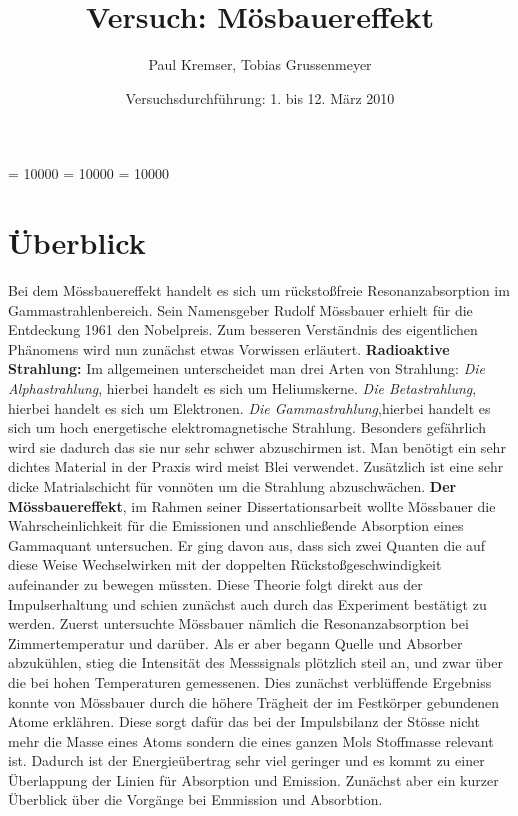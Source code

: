 \documentclass[12pt]{article}
\newcommand{\changefont}[3]{
\fontfamily{#1} \fontseries{#2} \fontshape{#3} \selectfont}
\begin{document}
\clubpenalty = 10000
\widowpenalty = 10000 
\displaywidowpenalty = 10000

\onehalfspacing
\changefont{ptm}{m}{n} 

\begin{titlepage}
\author{Paul Kremser, Tobias Grussenmeyer}
\title{Versuch: Mösbauereffekt}
\date{Versuchsdurchführung: 1. bis 12. März 2010} 
\maketitle
\thispagestyle{empty}
\end{titlepage}


\tableofcontents
\thispagestyle{empty}
\newpage
{}
\section{Überblick}
Bei dem Mössbauereffekt handelt es sich um rückstoßfreie Resonanzabsorption im Gammastrahlenbereich.
Sein Namensgeber Rudolf Mössbauer erhielt für die Entdeckung 1961 den Nobelpreis. Zum besseren Verständnis des
eigentlichen Phänomens wird nun zunächst etwas Vorwissen erläutert.
\textbf{Radioaktive Strahlung:}
Im allgemeinen unterscheidet man drei Arten von Strahlung:
\textit{Die Alphastrahlung}, 
hierbei handelt es sich um Heliumskerne.
\textit{Die Betastrahlung},
hierbei handelt es sich um Elektronen.
\textit{Die Gammastrahlung},hierbei handelt es sich um hoch energetische elektromagnetische Strahlung.
Besonders gefährlich wird sie dadurch das sie nur sehr schwer abzuschirmen ist. Man benötigt ein sehr dichtes Material in der Praxis
wird meist Blei verwendet. Zusätzlich ist eine sehr dicke Matrialschicht für vonnöten um die Strahlung abzuschwächen.
\newline
\textbf{Der Mössbauereffekt},
im Rahmen seiner Dissertationsarbeit wollte Mössbauer die Wahrscheinlichkeit für die Emissionen und anschließende Absorption eines Gammaquant untersuchen.
Er ging davon aus, dass sich zwei Quanten die auf diese Weise Wechselwirken mit der doppelten Rückstoßgeschwindigkeit aufeinander zu bewegen müssten.
Diese Theorie folgt direkt aus der Impulserhaltung und schien zunächst auch durch das Experiment bestätigt zu werden. Zuerst untersuchte Mössbauer nämlich die
Resonanzabsorption bei Zimmertemperatur und darüber. Als er aber begann Quelle und Absorber abzukühlen, stieg die Intensität des Messsignals plötzlich steil an,
und zwar über die bei hohen Temperaturen gemessenen. Dies zunächst verblüffende Ergebniss konnte von Mössbauer durch die höhere Trägheit der im Festkörper
gebundenen Atome erklähren. Diese sorgt dafür das bei der Impulsbilanz der Stösse nicht mehr die Masse eines Atoms sondern die eines ganzen Mols Stoffmasse 
relevant ist. Dadurch ist der Energieübertrag sehr viel geringer und es kommt zu einer Überlappung der Linien für Absorption und Emission. Zunächst aber ein
kurzer Überblick über die Vorgänge bei Emmission und Absorbtion. 
\end{document}
